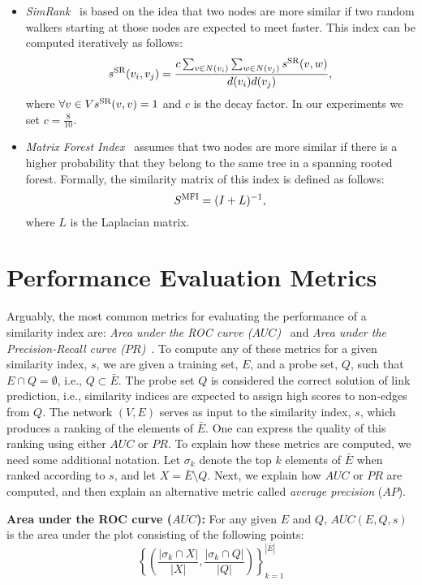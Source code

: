 \documentclass[twocolumn]{article}
\newcommand{\ROC}{\mathit{AUC}}
\newcommand{\PR}{\mathit{PR}}
\newcommand{\AP}{\mathit{AP}}
\newcommand{\ER}{\bar{E}}
\newcommand{\sSR}{s^{\text{\normalfont SR}}}
\newcommand{\SMFI}{S^{\text{\normalfont MFI}}}
\begin{document}
\begin{itemize}
\item \emph{SimRank}~\cite{jeh2002simrank} is based on the idea that two nodes are more similar if two random walkers starting at those nodes are expected to meet faster. This index can be computed iteratively as follows:
$$
\sSR(v_i,v_j) = \frac{c \sum_{v \in N(v_i)} \sum_{w \in N(v_j)} \sSR(v,w)}{d(v_i) d(v_j)},
$$
\noindent where $\forall{v \in V} \sSR(v,v) = 1$ and $c$ is the decay factor. In our experiments we set $c=\frac{8}{10}$.

\item \emph{Matrix Forest Index}~\cite{chebotarev2006matrix} assumes that two nodes are more similar if there is a higher probability that they belong to the same tree in a spanning rooted forest. Formally, the similarity matrix of this index is defined as follows:
$$
\SMFI = (I + L)^{-1},
$$
\noindent where $L$ is the Laplacian matrix.

\end{itemize}



\section{Performance Evaluation Metrics}\label{sec:evaluationmetrics}

\noindent Arguably, the most common metrics for evaluating the performance of a similarity index are: \textit{Area under the ROC curve ($\ROC$)}~\cite{fawcett2006introduction} and \textit{Area under the Precision-Recall curve ($\PR$)}~\cite{manning1999foundations}.
To compute any of these metrics for a given similarity index, $s$, we are given a training set, $E$, and a probe set, $Q$, such that $E \cap Q = \emptyset$, i.e., $Q \subset \ER$.
The probe set $Q$ is considered the correct solution of link prediction, i.e., similarity indices are expected to assign high scores to non-edges from $Q$.
The network $(V,E)$ serves as input to the similarity index, $s$, which produces a ranking of the elements of $\ER$.
One can express the quality of this ranking using either $\ROC$ or $\PR$.
To explain how these metrics are computed, we need some additional notation.
Let $\sigma_k$ denote the top $k$ elements of $\ER$ when ranked according to $s$, and let $X= \ER \setminus Q$.
Next, we explain how $\ROC$ or $\PR$ are computed, and then explain an alternative metric called \emph{average precision} ($\AP$).

\smallskip\smallskip
\noindent\textbf{Area under the ROC curve ($\ROC$):} For any given $E$ and $Q$,  $\ROC(E,Q, s)$ is the area under the plot consisting of the following points:
$$
\left\{\left(\frac{|\sigma_k \cap X|}{|X|}, \frac{|\sigma_k \cap Q|}{|Q|}\right)\right\}_{k=1}^{|\ER|}
$$
\end{document}
